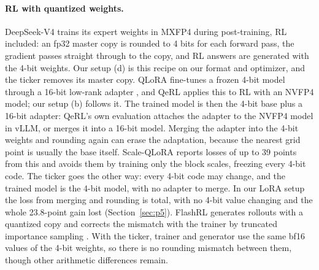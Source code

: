 \documentclass[11pt]{article}
\begin{document}
\paragraph{RL with quantized weights.} DeepSeek-V4 \citep{deepseek2026v4} trains its expert weights in MXFP4
during post-training, RL included: an fp32 master copy is rounded to 4 bits for each forward pass, the gradient
passes straight through to the copy, and RL answers are generated with the 4-bit weights. Our setup (d) is this
recipe on our format and optimizer, and the ticker removes its master copy. QLoRA \citep{dettmers2023qlora} fine-tunes a frozen 4-bit model through a
16-bit low-rank adapter \citep{hu2022lora}, and QeRL \citep{huang2025qerl} applies this to RL with an NVFP4 model; our
setup (b) follows it. The trained model is then the 4-bit base plus a 16-bit adapter: QeRL's own evaluation attaches
the adapter to the NVFP4 model in vLLM, or merges it into a 16-bit model. Merging the adapter into the 4-bit weights
and rounding again can erase the adaptation, because the nearest grid point is usually the base itself. Scale-QLoRA
\citep{li2026scaleqlora} reports losses of up to 39 points from this and avoids them by training only the block
scales, freezing every 4-bit code. The ticker goes the other way: every 4-bit code may change, and the trained model
is the 4-bit model, with no adapter to merge. In our LoRA setup the loss from merging and rounding is total, with no
4-bit value changing and the whole 23.8-point gain lost (Section~\ref{sec:p5}). FlashRL \citep{liu2025flashrl}
generates rollouts with a quantized copy and corrects the mismatch with the trainer by truncated importance sampling
\citep{yao2025offpolicy}. With the ticker, trainer and generator use the same bf16 values of the 4-bit weights, so
there is no rounding mismatch between them, though other arithmetic differences remain.

\end{document}
